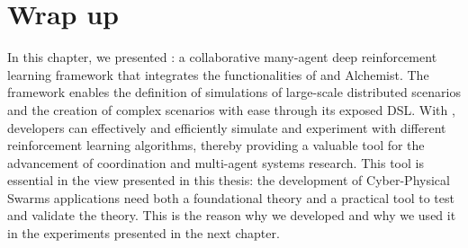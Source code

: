 \section{Wrap up}\label{coordination2023:conclusion}
In this chapter, we presented \scarlib{}: 
 a collaborative many-agent deep reinforcement learning framework that integrates the functionalities of \scafi{} and Alchemist.
%
 The framework enables the definition of simulations of large-scale distributed scenarios 
 and the creation of complex scenarios with ease through its exposed DSL. 
% 
With \scarlib{}, developers can effectively and efficiently simulate and experiment with different reinforcement learning algorithms, 
 thereby providing a valuable tool for the advancement of coordination and multi-agent systems research.
This tool is essential in the view presented in this thesis: the development of Cyber-Physical Swarms applications need both a foundational theory and a practical tool to test and validate the theory.
%
This is the reason why we developed \scarlib{} and why we used it in the experiments presented in the next chapter.

%
%
%
\printbibliography